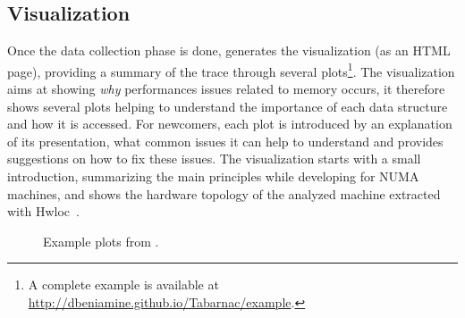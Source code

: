 



\subsection{Visualization}
\label{sec:design-visu}


Once the data collection phase is done,
\TABARNAC generates the visualization (as an HTML page), providing a summary
of the trace through several plots\footnote{A complete example is available at\\
    \url{http://dbeniamine.github.io/Tabarnac/example}.}.
The visualization aims at showing \emph{why} performances issues related
to memory occurs, it therefore shows several plots helping to understand the
importance of each data structure and how it is accessed.
For newcomers, each plot is introduced by an explanation
of its presentation, what common issues it can help to understand and provides
suggestions on how to fix these issues.  The visualization starts with a small
introduction, summarizing the main principles while developing for NUMA
machines, and shows the hardware topology of the analyzed machine extracted
with Hwloc~\cite{Broquedis10hwloc}.

\begin{figure*}[ht!]
    \centering
    \caption{Example plots from \TABARNAC.}
    \label{fig:example_plot1}
\end{figure*}


